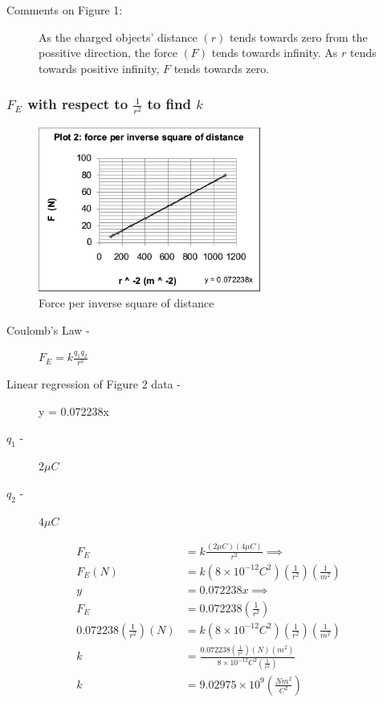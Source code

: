\documentclass{article}
\begin{document}
\begin{description}
	\item[Comments on Figure 1:] As the charged objects' distance $(r)$ tends towards zero
		from the possitive direction, the force $(F)$ tends towards infinity. As $r$ tends
		towards positive infinity, $F$ tends towards zero.
\end{description}

\subsubsection{$F_{E}$ with respect to $\frac{1}{r^2}$ to find $k$}%

\begin{figure}[H]
	\begin{center}
		\includegraphics[width=0.65\textwidth]{plot2} %
		\caption{Force per inverse square of distance}
	\end{center}
\end{figure}


\begin{description}
	\item[Coulomb's Law -]
		$F_{E} = k \frac{q_1 q_2}{r^2}$
	\item[Linear regression of Figure 2 data -] y = 0.072238x
	\item[$q_1$ -] $2 \mu C$
	\item[$q_2$ -] $4 \mu C$
\end{description}

\begin{align*}
	F_{E} &= k \frac{(2 \mu C)(4 \mu C)}{r^2} \implies \\
	F_{E} (N) &= k \left( 8 \times 10^{-12} C^2 \right)  \left( \frac{1}{r^2} \right) \left( \frac{1}{m^2} \right)  \\
	y &= 0.072238x \implies \\
	F_{E} &= 0.072238 \left( \frac{1}{r^2} \right)  \\
	0.072238 \left( \frac{1}{r^2} \right) (N) &=  k \left( 8 \times 10^{-12} C^2 \right) \left( \frac{1}{r^2} \right) \left( \frac{1}{m^2} \right)\\
	k &= \frac{  0.072238 \left( \frac{1}{r^2} \right) (N)(m^2)}{8 \times 10^{-12} C^2 \left(  \frac{1}{r^2}\right)  } \\
	k &= \boxed{9.02975 \times 10^{9}}\left( \frac{N m^2}{C^2} \right)  \\
\end{align*}
\end{document}
